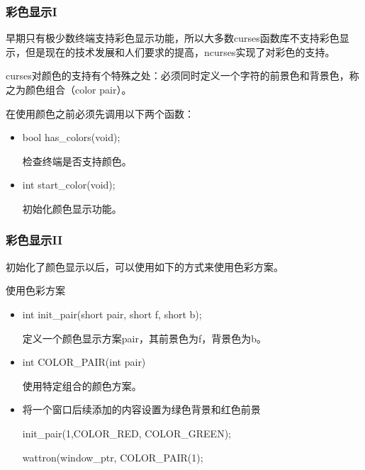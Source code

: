 \documentclass{beamer}
\begin{document}

\begin{frame}
\frametitle{彩色显示I}
早期只有极少数终端支持彩色显示功能，所以大多数curses函数库不支持彩色显示，但是现在的技术发展和人们要求的提高，ncurses实现了对彩色的支持。

curses对颜色的支持有个特殊之处：必须同时定义一个字符的前景色和背景色，称之为颜色组合（color pair）。


\begin{block}{在使用颜色之前必须先调用以下两个函数：}
\begin{itemize}
\item
bool has\_colors(void);

检查终端是否支持颜色。
\item
int start\_color(void);

初始化颜色显示功能。
\end{itemize}
\end{block}

\end{frame}

\begin{frame}
\frametitle{彩色显示II}
初始化了颜色显示以后，可以使用如下的方式来使用色彩方案。

\begin{block}{使用色彩方案}
\begin{itemize}
\item
int init\_pair(short pair, short f, short b);

定义一个颜色显示方案pair，其前景色为f，背景色为b。
\item
int COLOR\_PAIR(int pair)

使用特定组合的颜色方案。
\item
将一个窗口后续添加的内容设置为绿色背景和红色前景

init\_pair(1,COLOR\_RED, COLOR\_GREEN);

wattron(window\_ptr, COLOR\_PAIR(1);
\end{itemize}
\end{block}

\end{frame}
\end{document}
